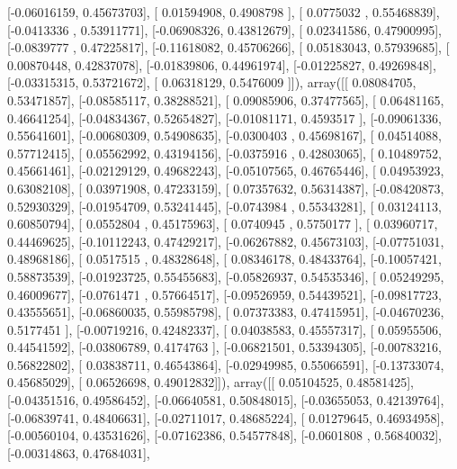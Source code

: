 \documentclass{article}
\begin{document}
       [-0.06016159,  0.45673703],
       [ 0.01594908,  0.4908798 ],
       [ 0.0775032 ,  0.55468839],
       [-0.0413336 ,  0.53911771],
       [-0.06908326,  0.43812679],
       [ 0.02341586,  0.47900995],
       [-0.0839777 ,  0.47225817],
       [-0.11618082,  0.45706266],
       [ 0.05183043,  0.57939685],
       [ 0.00870448,  0.42837078],
       [-0.01839806,  0.44961974],
       [-0.01225827,  0.49269848],
       [-0.03315315,  0.53721672],
       [ 0.06318129,  0.5476009 ]]), array([[ 0.08084705,  0.53471857],
       [-0.08585117,  0.38288521],
       [ 0.09085906,  0.37477565],
       [ 0.06481165,  0.46641254],
       [-0.04834367,  0.52654827],
       [-0.01081171,  0.4593517 ],
       [-0.09061336,  0.55641601],
       [-0.00680309,  0.54908635],
       [-0.0300403 ,  0.45698167],
       [ 0.04514088,  0.57712415],
       [ 0.05562992,  0.43194156],
       [-0.0375916 ,  0.42803065],
       [ 0.10489752,  0.45661461],
       [-0.02129129,  0.49682243],
       [-0.05107565,  0.46765446],
       [ 0.04953923,  0.63082108],
       [ 0.03971908,  0.47233159],
       [ 0.07357632,  0.56314387],
       [-0.08420873,  0.52930329],
       [-0.01954709,  0.53241445],
       [-0.0743984 ,  0.55343281],
       [ 0.03124113,  0.60850794],
       [ 0.0552804 ,  0.45175963],
       [ 0.0740945 ,  0.5750177 ],
       [ 0.03960717,  0.44469625],
       [-0.10112243,  0.47429217],
       [-0.06267882,  0.45673103],
       [-0.07751031,  0.48968186],
       [ 0.0517515 ,  0.48328648],
       [ 0.08346178,  0.48433764],
       [-0.10057421,  0.58873539],
       [-0.01923725,  0.55455683],
       [-0.05826937,  0.54535346],
       [ 0.05249295,  0.46009677],
       [-0.0761471 ,  0.57664517],
       [-0.09526959,  0.54439521],
       [-0.09817723,  0.43555651],
       [-0.06860035,  0.55985798],
       [ 0.07373383,  0.47415951],
       [-0.04670236,  0.5177451 ],
       [-0.00719216,  0.42482337],
       [ 0.04038583,  0.45557317],
       [ 0.05955506,  0.44541592],
       [-0.03806789,  0.4174763 ],
       [-0.06821501,  0.53394305],
       [-0.00783216,  0.56822802],
       [ 0.03838711,  0.46543864],
       [-0.02949985,  0.55066591],
       [-0.13733074,  0.45685029],
       [ 0.06526698,  0.49012832]]), array([[ 0.05104525,  0.48581425],
       [-0.04351516,  0.49586452],
       [-0.06640581,  0.50848015],
       [-0.03655053,  0.42139764],
       [-0.06839741,  0.48406631],
       [-0.02711017,  0.48685224],
       [ 0.01279645,  0.46934958],
       [-0.00560104,  0.43531626],
       [-0.07162386,  0.54577848],
       [-0.0601808 ,  0.56840032],
       [-0.00314863,  0.47684031],
\end{document}
